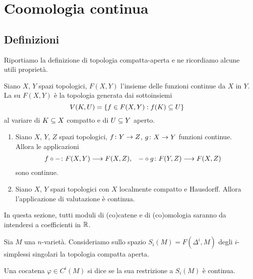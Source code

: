 \section{Coomologia continua}

\subsection{Definizioni}

Riportiamo la definizione di topologia compatta-aperta e ne ricordiamo alcune utili proprietà.

\begin{definition}
Siano $X$, $Y$ spazi topologici, $F(X,Y)$ l'insieme delle funzioni continue da $X$ in $Y$. La  su $F(X,Y)$ è la topologia generata dai sottoinsiemi
\[
V(K,U)=\{f\in F(X,Y): f(K)\subseteq U\}
\]
al variare di $K\subseteq X$ compatto e di $U\subseteq Y$ aperto.
\end{definition}

\begin{lemma}
\begin{enumerate}
\item Siano $X$, $Y$, $Z$ spazi topologici, $\map{f}{Y}{Z}$, $\map{g}{X}{Y}$ funzioni continue. Allora le applicazioni
\begin{align*}
\map{f\circ{-}}{F(X,Y)}{F(X,Z)},&&\map{{-}\circ g}{F(Y,Z)}{F(X,Z)}
\end{align*}
sono continue.
\item Siano $X$, $Y$ spazi topologici con $X$ localmente compatto e Hausdorff. Allora l'applicazione di valutazione
è continua.
\end{enumerate}
\end{lemma}

In questa sezione, tutti moduli di (co)catene e di (co)omologia saranno da intendersi a coefficienti in $\mathbb{R}$.

Sia $M$ una $n$-varietà. Consideriamo sullo spazio $S_i(M)=F(\Delta^i,M)$ degli $i$-simplessi singolari la topologia compatta aperta.

\begin{definition}
Una cocatena $\varphi\in C^i(M)$ si dice  se la sua restrizione a $S_i(M)$ è continua.
\end{definition}

